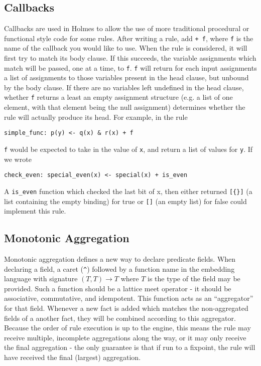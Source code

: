 \subsection{Callbacks}
\label{holmes:sec:callback}
Callbacks are used in Holmes to allow the use of more traditional procedural or functional style code for some rules.
After writing a rule, add \texttt{+ f}, where \texttt{f} is the name of the callback you would like to use.
When the rule is considered, it will first try to match its body clause.
If this succeeds, the variable assignments which match will be passed, one at a time, to \texttt{f}.
\texttt{f} will return for each input assignments a list of assignments to those variables present in the head clause, but unbound by the body clause.
If there are no variables left undefined in the head clause, whether \texttt{f} returns a least an empty assignment structure (e.g. a list of one element, with that element being the null assignment) determines whether the rule will actually produce its head.
For example, in the rule
\begin{verbatim}
simple_func: p(y) <- q(x) & r(x) + f
\end{verbatim}
\texttt{f} would be expected to take in the value of \texttt{x}, and return a list of values for \texttt{y}.
If we wrote
\begin{verbatim}
check_even: special_even(x) <- special(x) + is_even
\end{verbatim}
A \texttt{is_even} function which checked the last bit of x, then either returned \texttt{[\{\}]} (a list containing the empty binding) for true or \texttt{[]} (an empty list) for false could implement this rule.

\subsection{Monotonic Aggregation}
\label{holmes:sec:agg}
Monotonic aggregation defines a new way to declare predicate fields.
When declaring a field, a caret (\texttt{\^{}}) followed by a function name in the embedding language with signature $(T, T) \rightarrow T$ where $T$ is the type of the field may be provided.
Such a function should be a lattice meet operator - it should be associative, commutative, and idempotent.
This function acts as an ``aggregator'' for that field.
Whenever a new fact is added which matches the non-aggregated fields of a another fact, they will be combined according to this aggregator.
Because the order of rule execution is up to the engine, this means the rule may receive multiple, incomplete aggregations along the way, or it may only receive the final aggregation - the only guarantee is that if run to a fixpoint, the rule will have received the final (largest) aggregation.

